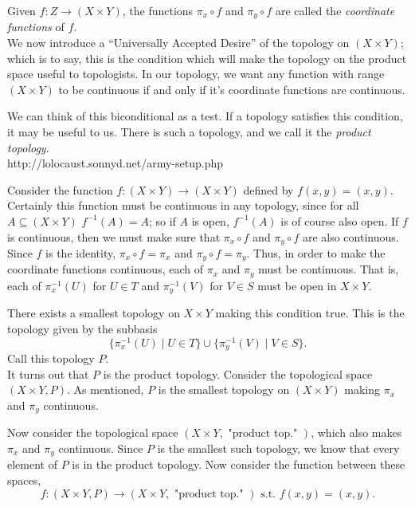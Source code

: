 \documentclass[12pt]{report}
\newcommand{\st}{\textrm{ s.t. }}
\newcommand{\inv}[1]{#1^{-1}}
\begin{document}
Given $f: Z \rightarrow (X \times Y)$, the functions $\pi_x \circ f$ and
$\pi_y \circ f$ are called the  {\em coordinate
functions} of $f$. \\

We now introduce a ``{\sc Universally Accepted Desire}'' of the topology on
$(X \times Y)$; which is to say, this is the condition which will make the
topology on the product space useful to topologists. In our topology, we
want any function with range $(X \times Y)$ to be continuous if and only
if it's coordinate functions are continuous.

We can think of this biconditional as a test. If a topology satisfies this
condition, it may be useful to us. There is such a topology, and we call it
the  {\em product topology}.\\http://lolocaust.sonnyd.net/army-setup.php

Consider the function $f:(X \times Y) \rightarrow (X \times Y)$ defined by
$f(x,y) = (x,y)$. Certainly this function must be continuous in any topology,
since for all $A \subseteq (X \times Y)$ $\inv{f}(A) = A$; so if $A$ is open,
$\inv{f}(A)$ is of course also open. If $f$ is continuous, then we must make
sure that $\pi_x \circ f$ and $\pi_y \circ f$ are also continuous. \\


Since $f$ is the identity, $\pi_x \circ f = \pi_x$ and $\pi_y \circ f =
\pi_y$. Thus, in order to make the coordinate functions continuous, each
of $\pi_x$ and $\pi_y$ must be continuous. That is, each
of $\inv{\pi_x}(U)$ for $U \in T$ and $\inv{\pi_y}(V)$ for $V \in S$
must be open in $X \times Y$.

There exists a smallest topology on $X \times Y$ making this condition true.
This is the topology given by the subbasis 
\begin{displaymath}
\{\inv{\pi_x}(U) \mid U \in T\} \cup \{\inv{\pi_y}(V) \mid V \in S\}.
\end{displaymath} 
Call this topology $P$.\\


It turns out that $P$ is the product topology. Consider the topological space 
$(X \times Y, P)$. 
As mentioned, $P$ is the smallest topology on $(X \times Y)$ making
$\pi_x$ and $\pi_y$ continuous. 

Now consider the topological space  $(X \times Y, \textrm{ "product top." })$, 
which also makes
$\pi_x$ and $\pi_y$ continuous. Since $P$ is the smallest such topology, 
we know that every element of $P$ is in the product topology. 
Now consider the function between these spaces,
\begin{displaymath}
f:(X \times Y, P) \rightarrow (X \times Y, \textrm{ "product top." }) \st
f(x,y) = (x,y).
\end{displaymath}
\end{document}
